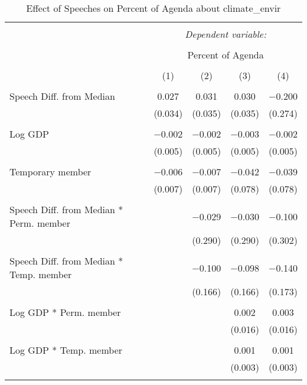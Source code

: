 
\begin{table}[!htbp] \centering 
  \caption{Effect of Speeches on Percent of Agenda about  climate_envir} 
  \label{} 
\begin{tabular}{@{\extracolsep{5pt}}lcccc} 
\\[-1.8ex]\hline 
\hline \\[-1.8ex] 
 & \multicolumn{4}{c}{\textit{Dependent variable:}} \\ 
\cline{2-5} 
\\[-1.8ex] & \multicolumn{4}{c}{Percent of Agenda} \\ 
\\[-1.8ex] & (1) & (2) & (3) & (4)\\ 
\hline \\[-1.8ex] 
 Speech Diff. from Median & 0.027 & 0.031 & 0.030 & $-$0.200 \\ 
  & (0.034) & (0.035) & (0.035) & (0.274) \\ 
  & & & & \\ 
 Log GDP & $-$0.002 & $-$0.002 & $-$0.003 & $-$0.002 \\ 
  & (0.005) & (0.005) & (0.005) & (0.005) \\ 
  & & & & \\ 
 Temporary member & $-$0.006 & $-$0.007 & $-$0.042 & $-$0.039 \\ 
  & (0.007) & (0.007) & (0.078) & (0.078) \\ 
  & & & & \\ 
 Speech Diff. from Median * Perm. member &  & $-$0.029 & $-$0.030 & $-$0.100 \\ 
  &  & (0.290) & (0.290) & (0.302) \\ 
  & & & & \\ 
 Speech Diff. from Median * Temp. member &  & $-$0.100 & $-$0.098 & $-$0.140 \\ 
  &  & (0.166) & (0.166) & (0.173) \\ 
  & & & & \\ 
 Log GDP * Perm. member &  &  & 0.002 & 0.003 \\ 
  &  &  & (0.016) & (0.016) \\ 
  & & & & \\ 
 Log GDP * Temp. member &  &  & 0.001 & 0.001 \\ 
  &  &  & (0.003) & (0.003) \\ 
  & & & & \\ 

\end{tabular}
\end{table}
